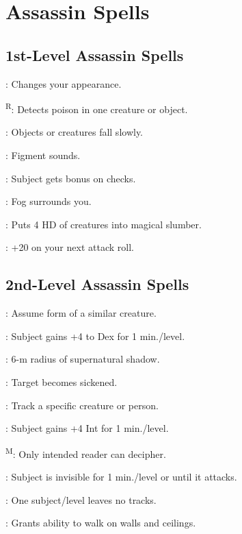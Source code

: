 \section{Assassin Spells}




\subsection{1st-Level Assassin Spells}

: Changes your appearance.

\textsuperscript{R}: Detects poison in one creature or object.

: Objects or creatures fall slowly.

: Figment sounds.

: Subject gets bonus on  checks.

: Fog surrounds you.

: Puts 4 HD of creatures into magical slumber.

: +20 on your next attack roll.




\subsection{2nd-Level Assassin Spells}

: Assume form of a similar creature.

: Subject gains +4 to Dex for 1 min./level.

: 6-m radius of supernatural shadow.

: Target becomes sickened. %

: Track a specific creature or person. %

: Subject gains +4 Int for 1 min./level.

\textsuperscript{M}: Only intended reader can decipher.

: Subject is invisible for 1 min./level or until it attacks.

: One subject/level leaves no tracks.

: Grants ability to walk on walls and ceilings.

